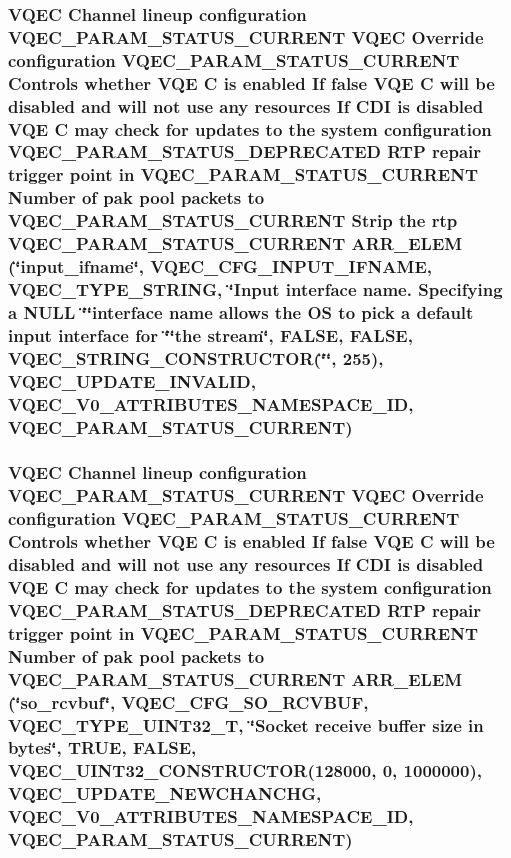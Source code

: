 \subsubsection{\setlength{\rightskip}{0pt plus 5cm}VQEC Channel lineup configuration VQEC\_\-PARAM\_\-STATUS\_\-CURRENT VQEC Override configuration VQEC\_\-PARAM\_\-STATUS\_\-CURRENT Controls whether VQE \bf{C} is enabled If false VQE \bf{C} will be disabled and will not use any resources If CDI is disabled VQE \bf{C} may check for updates \bf{to} the system configuration VQEC\_\-PARAM\_\-STATUS\_\-DEPRECATED RTP repair trigger point in VQEC\_\-PARAM\_\-STATUS\_\-CURRENT Number of pak pool packets \bf{to} VQEC\_\-PARAM\_\-STATUS\_\-CURRENT Strip the rtp VQEC\_\-PARAM\_\-STATUS\_\-CURRENT ARR\_\-ELEM (\char`\"{}input\_\-ifname\char`\"{}, VQEC\_\-CFG\_\-INPUT\_\-IFNAME, \bf{VQEC\_\-TYPE\_\-STRING}, \char`\"{}Input interface name. Specifying a NULL \char`\"{}\char`\"{}interface name allows the OS \bf{to} pick a default input interface for \char`\"{}\char`\"{}the stream\char`\"{}, \bf{FALSE}, \bf{FALSE}, VQEC\_\-STRING\_\-CONSTRUCTOR(\char`\"{}\char`\"{}, 255), \bf{VQEC\_\-UPDATE\_\-INVALID}, \bf{VQEC\_\-V0\_\-ATTRIBUTES\_\-NAMESPACE\_\-ID}, VQEC\_\-PARAM\_\-STATUS\_\-CURRENT)}\label{vqec__cfg__settings_8h_2b9ec0070b4befe0ee1d67e74422e71b}


\subsubsection{\setlength{\rightskip}{0pt plus 5cm}VQEC Channel lineup configuration VQEC\_\-PARAM\_\-STATUS\_\-CURRENT VQEC Override configuration VQEC\_\-PARAM\_\-STATUS\_\-CURRENT Controls whether VQE \bf{C} is enabled If false VQE \bf{C} will be disabled and will not use any resources If CDI is disabled VQE \bf{C} may check for updates \bf{to} the system configuration VQEC\_\-PARAM\_\-STATUS\_\-DEPRECATED RTP repair trigger point in VQEC\_\-PARAM\_\-STATUS\_\-CURRENT Number of pak pool packets \bf{to} VQEC\_\-PARAM\_\-STATUS\_\-CURRENT ARR\_\-ELEM (\char`\"{}so\_\-rcvbuf\char`\"{}, VQEC\_\-CFG\_\-SO\_\-RCVBUF, \bf{VQEC\_\-TYPE\_\-UINT32\_\-T}, \char`\"{}Socket receive buffer size in bytes\char`\"{}, \bf{TRUE}, \bf{FALSE}, VQEC\_\-UINT32\_\-CONSTRUCTOR(128000, 0, 1000000), \bf{VQEC\_\-UPDATE\_\-NEWCHANCHG}, \bf{VQEC\_\-V0\_\-ATTRIBUTES\_\-NAMESPACE\_\-ID}, VQEC\_\-PARAM\_\-STATUS\_\-CURRENT)}\label{vqec__cfg__settings_8h_5f3b5ccd57496519a044595a9773bb90}


